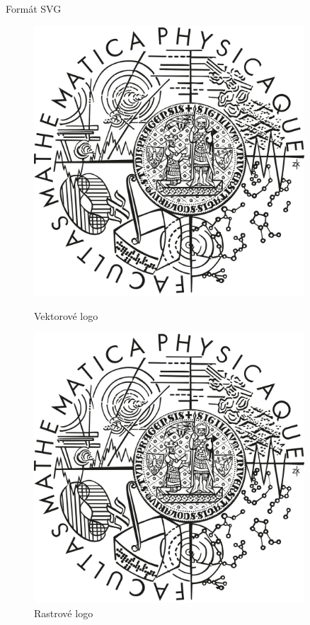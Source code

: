 \begin{frame}[t,fragile]{Formát SVG}
    \begin{figure}[!htb]
        \centering
        \begin{minipage}{.5\textwidth}
            \centering
            \includegraphics[width=0.9\textwidth]{image/logo.pdf}
            \caption{Vektorové logo}
            \label{fig:prob1_6_2}
        \end{minipage}%
        \begin{minipage}{.5\textwidth}
            \centering
            \includegraphics[width=0.9\textwidth]{image/logo.png}
            \caption{Rastrové logo}
            \label{fig:prob1_6_1}
        \end{minipage}
    \end{figure}
\end{frame}

